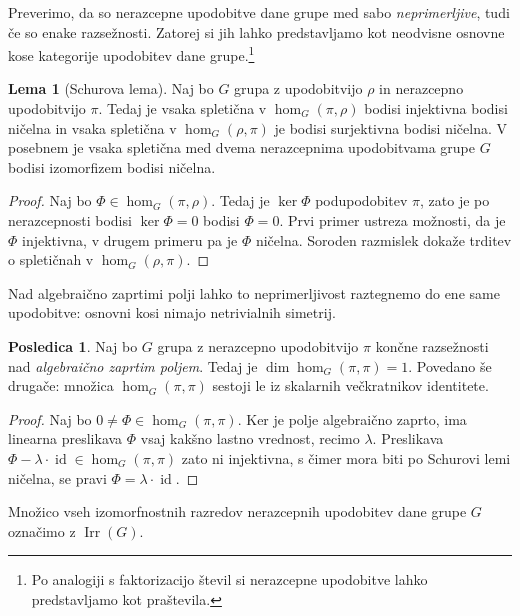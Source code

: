 \documentclass[11pt]{book}
\DeclareMathOperator\Irr{Irr}
\DeclareMathOperator\id{id}
\theoremstyle{definition}
\theoremstyle{zgled}
\theoremstyle{odprtproblem}
\theoremstyle{domacanaloga}
\newenvironment{dokaz}
    {\color{siva}\begin{proof}}
    {\end{proof}}
\theoremstyle{izrek}
\newtheorem*{lema}{Lema}
\newtheorem*{posledica}{Posledica}
\begin{document}
Preverimo, da so nerazcepne upodobitve dane grupe med sabo \emph{neprimerljive}, tudi če so enake razsežnosti. Zatorej si jih lahko predstavljamo kot neodvisne osnovne kose kategorije upodobitev dane grupe.\footnote{Po analogiji s faktorizacijo števil si nerazcepne upodobitve lahko predstavljamo kot praštevila.} 

\begin{lema}[Schurova lema]
Naj bo $G$ grupa z upodobitvijo $\rho$ in nerazcepno upodobitvijo $\pi$. Tedaj je vsaka spletična v $\hom_G(\pi, \rho)$ bodisi injektivna bodisi ničelna in vsaka spletična v $\hom_G(\rho, \pi)$ je bodisi surjektivna bodisi ničelna. V posebnem je vsaka spletična med dvema nerazcepnima upodobitvama grupe $G$ bodisi izomorfizem bodisi ničelna.
\end{lema}
\begin{dokaz}
Naj bo $\Phi \in \hom_G(\pi, \rho)$. Tedaj je $\ker \Phi$ podupodobitev $\pi$, zato je po nerazcepnosti bodisi $\ker \Phi = 0$ bodisi $\Phi = 0$. Prvi primer ustreza možnosti, da je $\Phi$ injektivna, v drugem primeru pa je $\Phi$ ničelna. Soroden razmislek dokaže trditev o spletičnah v $\hom_G(\rho, \pi)$. 
\end{dokaz}

Nad algebraično zaprtimi polji lahko to neprimerljivost raztegnemo do ene same upodobitve: osnovni kosi nimajo netrivialnih simetrij.

\begin{posledica}
Naj bo $G$ grupa z nerazcepno upodobitvijo $\pi$ končne razsežnosti nad \emph{algebraično zaprtim poljem}. Tedaj je $\dim \hom_G(\pi, \pi) = 1$. Povedano še drugače: množica $\hom_G(\pi, \pi)$ sestoji le iz skalarnih večkratnikov identitete.
\end{posledica}
\begin{dokaz}
Naj bo $0 \neq \Phi \in \hom_G(\pi, \pi)$. Ker je polje algebraično zaprto, ima linearna preslikava $\Phi$ vsaj kakšno lastno vrednost, recimo $\lambda$. Preslikava $\Phi - \lambda \cdot \id \in \hom_G(\pi, \pi)$ zato ni injektivna, s čimer mora biti po Schurovi lemi ničelna, se pravi $\Phi = \lambda \cdot \id$.
\end{dokaz}

Množico vseh izomorfnostnih razredov nerazcepnih upodobitev dane grupe $G$ označimo z $\Irr(G)$.
\end{document}
